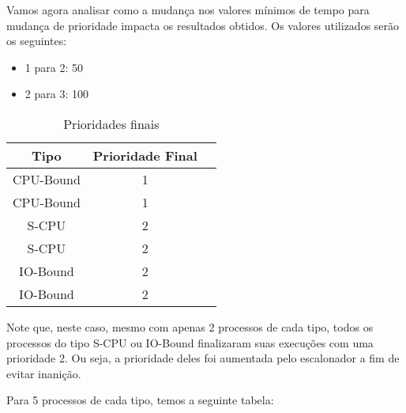 \documentclass{article}
\begin{document}
Vamos agora analisar como a mudança nos valores mínimos de tempo para mudança
de prioridade impacta os resultados obtidos. Os valores utilizados serão os
seguintes:

\begin{itemize}
      \item 1 para 2: 50
      \item 2 para 3: 100
\end{itemize}

\begin{table}[H]
      \centering
      \begin{tabular}{|c|c|c|}
            \hline
            \textbf{Tipo} & \textbf{Prioridade Final} \\
            \hline
            CPU-Bound     & 1                         \\
            CPU-Bound     & 1                         \\
            S-CPU         & 2                         \\
            S-CPU         & 2                         \\
            IO-Bound      & 2                         \\
            IO-Bound      & 2                         \\
            \hline
      \end{tabular}
      \caption{Prioridades finais}
\end{table}

Note que, neste caso, mesmo com apenas 2 processos de cada tipo, todos os
processos do tipo S-CPU ou IO-Bound finalizaram suas execuções com uma
prioridade 2. Ou seja, a prioridade deles foi aumentada pelo escalonador a fim
de evitar inanição.

Para 5 processos de cada tipo, temos a seguinte tabela:
\end{document}
